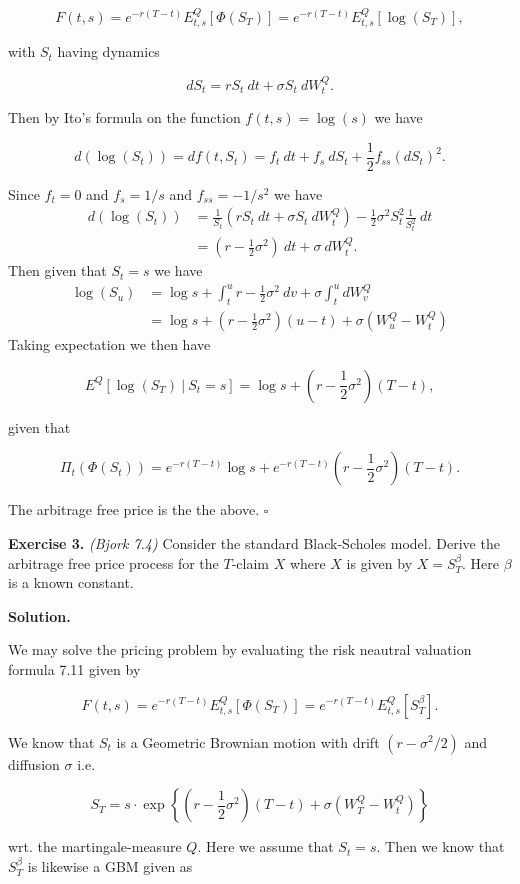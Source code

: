 \documentclass[a4paper,12pt,openany]{book}
\begin{document}
\[
F(t,s)=e^{-r(T-t)}E^Q_{t,s}[\Phi(S_T)]=e^{-r(T-t)}E^Q_{t,s}[\log(S_T)],
\]

with \(S_t\) having dynamics

\[
dS_t=rS_t\ dt+\sigma S_t\ dW_t^Q.
\]

Then by Ito's formula on the function \(f(t,s)=\log(s)\) we have

\[
d(\log(S_t))=d f(t,S_t)=f_t\ dt+f_s\ dS_t+\frac{1}{2}f_{ss}(dS_t)^2.
\]

Since \(f_t=0\) and \(f_s=1/s\) and \(f_{ss}=-1/s^2\) we have
\begin{align*}
d(\log(S_t))&=\frac{1}{S_t}(rS_t\ dt+\sigma S_t\ dW_t^Q)-\frac{1}{2}\sigma^2S_t^2\frac{1}{S_t^2}\ dt\\
&=\left(r-\frac{1}{2}\sigma^2\right)\ dt+\sigma \ dW_t^Q.
\end{align*}
Then given that \(S_t=s\) we have
\begin{align*}
\log(S_u)&=\log s+\int_t^ur-\frac{1}{2}\sigma^2\ dv+\sigma\int_t^u dW_v^Q\\
&=\log s+\left(r-\frac{1}{2}\sigma^2\right)(u-t)+\sigma(W_u^Q-W_t^Q)
\end{align*}
Taking expectation we then have

\[
E^Q[\log(S_T)\ \vert\ S_t=s]=\log s+\left(r-\frac{1}{2}\sigma^2\right)(T-t),
\]

given that

\[
\Pi_t(\Phi(S_t))=e^{-r(T-t)}\log s+e^{-r(T-t)}\left(r-\frac{1}{2}\sigma^2\right)(T-t).
\]

The arbitrage free price is the the above. \(\square\)

\textbf{Exercise 3.} \emph{(Bjork 7.4)} Consider the standard Black-Scholes model. Derive the arbitrage free price process for the \(T\)-claim \(X\) where \(X\) is given by \(X=S_T^\beta\). Here \(\beta\) is a known constant.

\textbf{Solution.}

We may solve the pricing problem by evaluating the risk neautral valuation formula 7.11 given by

\[
F(t,s)=e^{-r(T-t)}E^Q_{t,s}[\Phi(S_T)]=e^{-r(T-t)}E^Q_{t,s}[S_T^\beta].
\]

We know that \(S_t\) is a Geometric Brownian motion with drift \((r-\sigma^2/2)\) and diffusion \(\sigma\) i.e.

\[
S_T=s\cdot\exp\left\{\left(r-\frac{1}{2}\sigma^2\right)(T-t)+\sigma (W_T^Q-W_t^Q)\right\}
\]

wrt. the martingale-measure \(Q\). Here we assume that \(S_t=s\). Then we know that \(S_T^\beta\) is likewise a GBM given as
\end{document}
